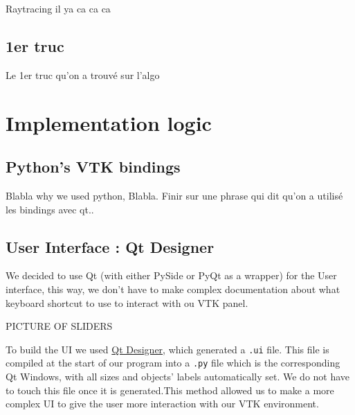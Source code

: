 \documentclass[10pt,twocolumn,letterpaper]{article}
\def\code#1{\texttt{#1}}
\begin{document}
    Raytracing il ya ca ca ca


    \subsection{1er truc}

Le 1er truc qu'on a trouvé sur l'algo


\section{Implementation logic}

    \subsection{Python's VTK bindings}

Blabla why we used python, Blabla.
Finir sur une phrase qui dit qu'on a utilisé les bindings avec qt..

    \subsection{User Interface : Qt Designer}

    We decided to use Qt (with either PySide or PyQt as a wrapper) for the User
interface, this way, we don't have to make complex documentation about what
keyboard shortcut to use to interact with ou VTK panel. 

PICTURE OF SLIDERS

To build the UI we used \href{https://doc.qt.io/qt-5/qtdesigner-manual.html}{Qt Designer},
which generated a \code{.ui} file. This file is compiled at the start of our
program into a \code{.py} file which is the corresponding Qt Windows, with all
sizes and objects' labels automatically set. We do not have to touch this file
once it is generated.This method allowed us to make a more complex UI to give
the user more interaction with our VTK environment.
\end{document}
